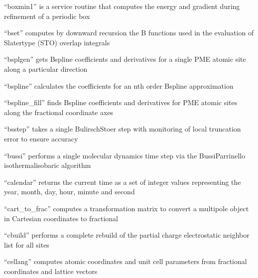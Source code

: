 \documentclass[letterpaper,11pt,english]{sphinxmanual}
\begin{document}

“boxmin1” is a service routine that computes the energy and
gradient during refinement of a periodic box


“bset” computes by downward recursion the B functions used
in the evaluation of Slater\sphinxhyphen{}type (STO) overlap integrals


“bsplgen” gets B\sphinxhyphen{}spline coefficients and derivatives for
a single PME atomic site along a particular direction


“bspline” calculates the coefficients for an n\sphinxhyphen{}th order
B\sphinxhyphen{}spline approximation


“bspline\_fill” finds B\sphinxhyphen{}spline coefficients and derivatives
for PME atomic sites along the fractional coordinate axes


“bsstep” takes a single Bulirsch\sphinxhyphen{}Stoer step with monitoring
of local truncation error to ensure accuracy


“bussi” performs a single molecular dynamics time step via
the Bussi\sphinxhyphen{}Parrinello isothermal\sphinxhyphen{}isobaric algorithm


“calendar” returns the current time as a set of integer values
representing the year, month, day, hour, minute and second


“cart\_to\_frac” computes a transformation matrix to convert
a multipole object in Cartesian coordinates to fractional


“cbuild” performs a complete rebuild of the partial charge
electrostatic neighbor list for all sites


“cellang” computes atomic coordinates and unit cell parameters
from fractional coordinates and lattice vectors
\end{document}

